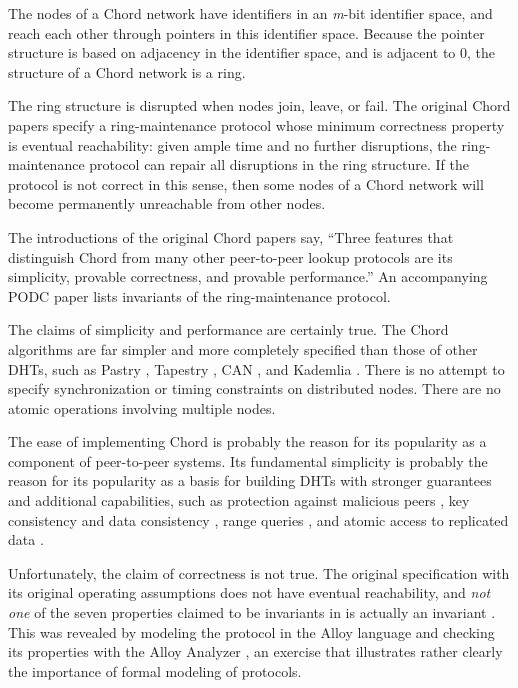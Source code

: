 \documentclass[conference]{IEEEtran}
\begin{document}
The nodes of a Chord network have identifiers in an {\it m}-bit
identifier space, and
reach each other through pointers in this identifier space.
Because the pointer structure is based on adjacency in the identifier
space, and  is adjacent to 0, the structure of a
Chord network is a ring.

The ring structure is disrupted when nodes join, leave, or fail.
The original Chord papers \cite{chord-sigcomm,chord-ton}
specify a ring-maintenance protocol whose 
minimum correctness property is eventual
reachability:  given ample time and no further disruptions, 
the ring-maintenance protocol can repair all disruptions in the ring
structure.
If the protocol is not correct in this sense, then some nodes of a
Chord network will become permanently unreachable from other nodes.

The introductions of the original Chord papers
say, ``Three features that
distinguish Chord from many other peer-to-peer lookup protocols
are its simplicity, provable correctness, and provable performance.''
An accompanying PODC paper \cite{chord-podc}
lists invariants of the ring-maintenance protocol.

The claims of simplicity and performance are certainly true.
The Chord algorithms are far simpler and more completely specified
than those of other DHTs, such as Pastry \cite{pastry},
Tapestry \cite{tapestry}, CAN \cite{CAN}, and Kademlia \cite{kademlia}.
There is no attempt to specify synchronization or timing constraints
on distributed nodes.
There are no atomic operations involving multiple nodes.

The ease of implementing Chord is probably the reason for its
popularity as a component of peer-to-peer systems.
Its fundamental simplicity is probably the reason for its
popularity as a
basis for building DHTs with stronger guarantees and additional
capabilities, such as
protection against malicious peers
\cite{awerbuch-robust,chord-byz,sechord},
key consistency and data consistency \cite{scatter},
range queries \cite{rangequeries},
and atomic access to replicated data \cite{atomicchord,etna}.

Unfortunately, the claim of correctness is not true.
The original specification with its original operating
assumptions does not have eventual reachability,
and {\it not one} of the seven properties claimed to be invariants
in \cite{chord-podc} is actually an invariant
\cite{chord-ccr}.
This was revealed by modeling the protocol in the Alloy language
and checking its properties with the Alloy Analyzer \cite{alloy-book},
an exercise that illustrates rather clearly the importance of formal
modeling of protocols.
\end{document}
